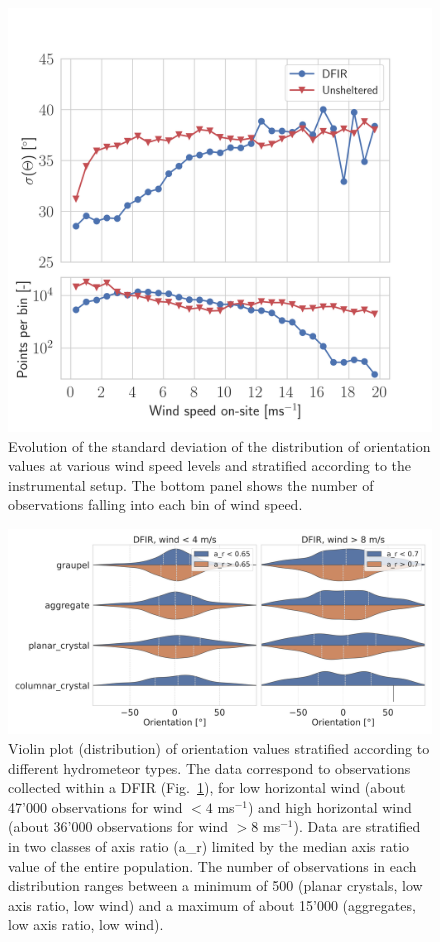 \documentclass[draft]{agujournal2019}
\begin{document}
\begin{figure}
 \noindent \centering \includegraphics[width=\textwidth]{Fig04.png}
\caption{Evolution of the standard deviation of the  distribution of orientation values at various wind speed levels and stratified according to the instrumental setup. The bottom panel shows the number of observations falling into each bin of wind speed.  }
\label{fig:wind-effect}
\end{figure}

\begin{figure}
 \noindent \centering \includegraphics[width=\textwidth]{Fig05.png}
\caption{Violin plot (distribution) of orientation values stratified according to different hydrometeor types. The data correspond to observations collected within a DFIR (Fig.~\ref{fig:wind-effect}), for low horizontal wind (about 47'000 observations for wind $<4$ ms$^{-1}$) and high horizontal wind (about 36'000 observations for wind $>8$ ms$^{-1}$). Data are stratified in two classes of axis ratio (a\_r) limited by the median axis ratio value of the entire population. The number of observations in each distribution ranges between a minimum of 500 (planar crystals, low axis ratio, low wind) and a maximum of about 15'000 (aggregates, low axis ratio, low wind).} 
\label{fig:hydroclass}
\end{figure}
\end{document}
